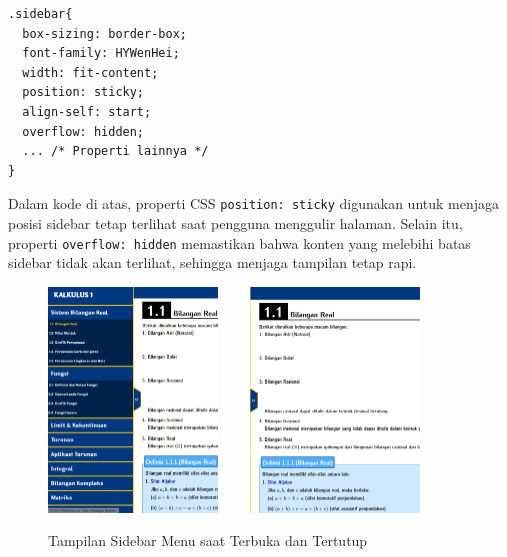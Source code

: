 \documentclass{file/KP-ITS}
\theoremstyle{definition}
\theoremstyle{definition}
\theoremstyle{plain}
\begin{document}
\begin{verbatim}
.sidebar{
  box-sizing: border-box;
  font-family: HYWenHei;
  width: fit-content;
  position: sticky;
  align-self: start;
  overflow: hidden;
  ... /* Properti lainnya */
}
\end{verbatim}
Dalam kode di atas, properti CSS \texttt{position: sticky} digunakan untuk menjaga posisi sidebar tetap terlihat saat pengguna menggulir halaman. Selain itu, properti \texttt{overflow: hidden} memastikan bahwa konten yang melebihi batas sidebar tidak akan terlihat, sehingga menjaga tampilan tetap rapi.
\begin{figure}[h!]
  \centering
  \includegraphics[width=0.4\textwidth]{foto/SidebarBuka.png}$\qquad$
  \includegraphics[width=0.4\textwidth]{foto/SidebarTutup.png}
  \caption{Tampilan Sidebar Menu saat Terbuka dan Tertutup}
\end{figure}
\end{document}
